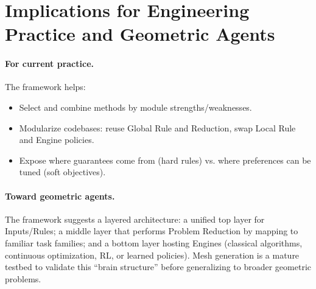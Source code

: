 \section{Implications for Engineering Practice and Geometric Agents}
\paragraph{For current practice.} The framework helps:
\begin{itemize}
  \item Select and combine methods by module strengths/weaknesses.
  \item Modularize codebases: reuse Global Rule and Reduction, swap Local Rule and Engine policies.
  \item Expose where guarantees come from (hard rules) vs. where preferences can be tuned (soft objectives).
\end{itemize}

\paragraph{Toward geometric agents.} The framework suggests a layered architecture: a unified top layer for Inputs/Rules; a middle layer that performs Problem Reduction by mapping to familiar task families; and a bottom layer hosting Engines (classical algorithms, continuous optimization, RL, or learned policies). Mesh generation is a mature testbed to validate this ``brain structure'' before generalizing to broader geometric problems.
